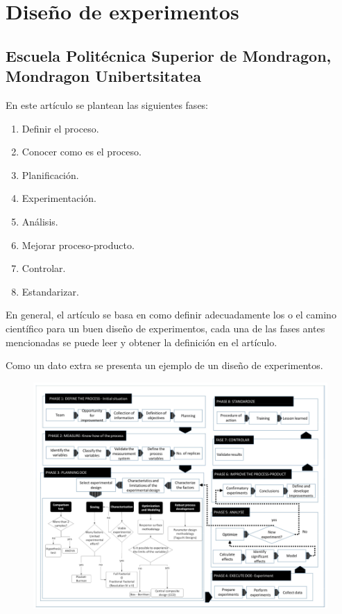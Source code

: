 \documentclass{article}
\begin{document}
\section*{Diseño de experimentos}
\subsection*{Escuela Politécnica Superior de Mondragon, Mondragon Unibertsitatea}
En este artículo se plantean las siguientes fases:

\begin{enumerate}
  \item Definir el proceso.
  \item Conocer como es el proceso.
  \item Planificación.
  \item Experimentación.
  \item Análisis.
  \item Mejorar proceso-producto.
  \item Controlar.
  \item Estandarizar.
\end{enumerate}

En general, el artículo se basa en como definir adecuadamente los o el camino científico para un buen diseño de experimentos, cada una de las fases antes mencionadas se puede leer y obtener la definición en el artículo.

Como un dato extra se presenta un ejemplo de un diseño de experimentos.

\begin{figure}[ht!]
\centering
\includegraphics*[scale = 0.4]{mapa_conceptual.png}  
\end{figure}
\end{document}
